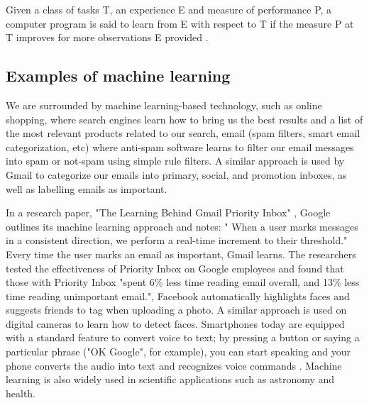 Given a class of tasks T, an experience E and measure of performance P, a computer program is said to learn from E with respect to T if the measure P at T improves for more observations E provided \citep{michalski2013machine}. 
\subsection{Examples of machine learning}

We are surrounded by machine learning-based technology, such as online shopping, where  search engines learn how to bring us the best results and a list of the most relevant products related to our search, email (spam filters, smart email categorization, etc)  where anti-spam software learns to filter our email messages into spam or not-spam using simple rule filters. A similar approach is used by Gmail to categorize our emails into primary, social, and promotion inboxes, as well as labelling emails as important. 

In a research paper, "The Learning Behind Gmail Priority Inbox" \citep{aberdeen2010learning}, Google outlines its machine learning approach  and notes: " When a user marks messages in a consistent direction, we perform a real-time increment to their threshold." Every time the user marks an email as important, Gmail learns. The researchers tested the effectiveness of Priority Inbox on Google employees and found that those with Priority Inbox "spent 6\% less time reading email overall, and 13\% less time reading unimportant email.",  Facebook  automatically highlights faces and suggests friends to tag when uploading a photo. A similar approach is used on digital cameras to learn how to detect faces. Smartphones today are equipped with a standard feature to convert voice to text; by pressing a button or saying a particular phrase ("OK Google", for example), you can start speaking and your phone converts the audio into text and recognizes voice commands \citep{Techemergence}.  
Machine learning is also widely used in scientific applications such as astronomy and health.


